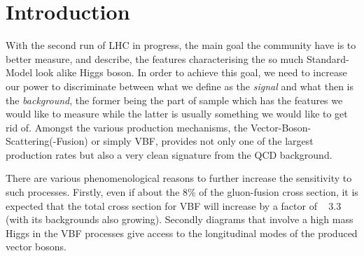 \section{Introduction } 
With the second run of LHC in progress, the main goal the community have is to
better measure, and describe, the features characterising the so much Standard-Model
look alike Higgs boson. In order to achieve this goal, we need to increase our power
to discriminate between what we define as the {\it signal} and what then is the {\it background}, the former being the part of sample which has the features we would like to measure while the latter is usually something we would like to get rid of.
Amongst the various production mechanisms, the Vector-Boson-Scattering(-Fusion) or simply VBF, provides not only one of the largest production rates but also a very clean signature from the QCD background.

There are various phenomenological reasons to further increase the sensitivity to such processes. Firstly, even if about the 8\% of the gluon-fusion cross section, it is expected
that the total cross section for VBF will increase by a factor of ~ 3.3 (with its backgrounds also growing). Secondly diagrams that involve a high mass Higgs in the VBF processes give access to the longitudinal modes of the produced vector bosons. 